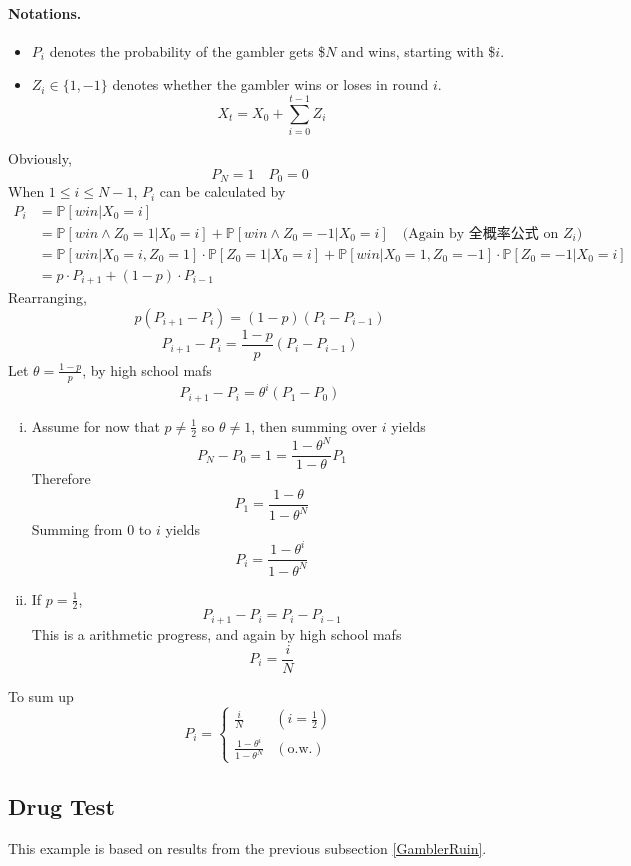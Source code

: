 \paragraph*{Notations.}
\begin{itemize}
    \item $P_i$ denotes the probability of the gambler gets \$$N$ and wins, starting with \$$i$.
    \item $Z_i \in \{1, -1\}$ denotes whether the gambler wins or loses in round $i$.
    \[ X_t = X_0 + \sum_{i=0}^{t-1}Z_i \]
\end{itemize}
Obviously,
\[ P_N = 1 \quad P_0 = 0 \]
When $1 \le i \le N-1$, $P_i$ can be calculated by
\begin{align*}
    P_i &= \mathbb{P}[win | X_0 = i] \\
    &= \mathbb{P}[win \wedge Z_0 = 1 | X_0 = i] + \mathbb{P}[win \wedge Z_0 = -1 | X_0 = i] \quad \text{(Again by 全概率公式 on $Z_i$)} \\
    &= \mathbb{P}[win | X_0=i, Z_0 = 1]\cdot\mathbb{P}[Z_0=1|X_0=i] + \mathbb{P}[win|X_0=1, Z_0=-1]\cdot\mathbb{P}[Z_0=-1|X_0=i] \\
    &= p\cdot P_{i+1} + (1-p)\cdot P_{i-1}
\end{align*}
Rearranging,
\[ p(P_{i+1} - P_i) = (1-p)(P_i - P_{i-1}) \]
\[ P_{i+1} -P_i = \frac{1-p}{p}(P_i - P_{i-1}) \]
Let $\theta = \frac{1-p}{p}$, by high school mafs
\[ P_{i+1} - P_i = \theta^i(P_1 - P_{0}) \]
\begin{enumerate}[(i)]
    \item Assume for now that $p \neq \frac{1}{2}$ so $\theta \neq 1$, then summing over $i$ yields
    \[ P_N - P_0 = 1 = \frac{1-\theta^N}{1-\theta} P_1 \]
    Therefore
    \[ P_1 = \frac{1-\theta}{1-\theta^N} \]
    Summing from $0$ to $i$ yields
    \[ P_i = \frac{1-\theta^i}{1-\theta^N} \]
    \item If $p=\frac{1}{2}$,
    \[ P_{i+1} - P_i = P_i - P_{i-1} \]
    This is a arithmetic progress, and again by high school mafs
    \[ P_i = \frac{i}{N} \]
\end{enumerate}
To sum up
\[ 
    P_i = 
    \begin{cases}
        \frac{i}{N} &(i = \frac{1}{2})\\
        \frac{1-\theta^i}{1-\theta^N} &(\text{o.w.})
    \end{cases}    
\]

\subsection{Drug Test}\label{DrugTest}
This example is based on results from the previous subsection \ref{GamblerRuin}.
